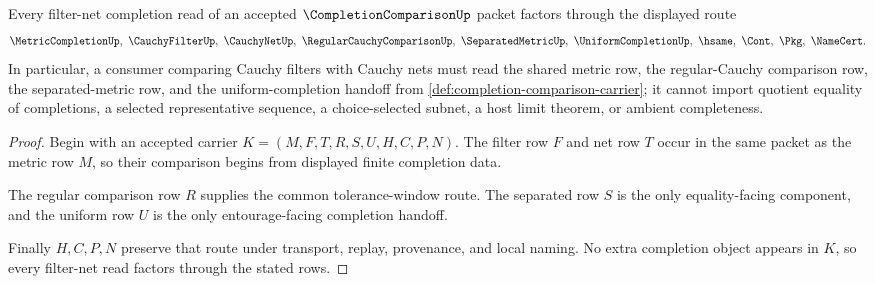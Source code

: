 \begin{theorem}
\label{thm:completion-comparison-filter-net-correspondence}
Every filter-net completion read of an accepted $\CompletionComparisonUp$ packet factors through the displayed route
$$
\MetricCompletionUp,\ \CauchyFilterUp,\ \CauchyNetUp,\ \RegularCauchyComparisonUp,\ \SeparatedMetricUp,\ \UniformCompletionUp,\ \hsame,\ \Cont,\ \Pkg,\ \NameCert .
$$
In particular, a consumer comparing Cauchy filters with Cauchy nets must read the shared metric row, the regular-Cauchy comparison row, the separated-metric row, and the uniform-completion handoff from \autoref{def:completion-comparison-carrier}; it cannot import quotient equality of completions, a selected representative sequence, a choice-selected subnet, a host limit theorem, or ambient completeness.
\end{theorem}
\begin{proof}
Begin with an accepted carrier $K=(M,F,T,R,S,U,H,C,P,N)$. The filter row $F$ and net row $T$ occur in the same packet as the metric row $M$, so their comparison begins from displayed finite completion data.

The regular comparison row $R$ supplies the common tolerance-window route. The separated row $S$ is the only equality-facing component, and the uniform row $U$ is the only entourage-facing completion handoff.

Finally $H,C,P,N$ preserve that route under transport, replay, provenance, and local naming. No extra completion object appears in $K$, so every filter-net read factors through the stated rows.
\end{proof}




